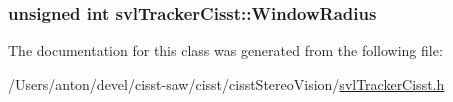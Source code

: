 \subsubsection[{Window\+Radius}]{\setlength{\rightskip}{0pt plus 5cm}unsigned int svl\+Tracker\+Cisst\+::\+Window\+Radius\hspace{0.3cm}{\ttfamily [protected]}}\label{classsvl_tracker_cisst_ab5a2873a52b1514093c0ca59cd4cb51b}


The documentation for this class was generated from the following file\+:\begin{DoxyCompactItemize}
\item 
/\+Users/anton/devel/cisst-\/saw/cisst/cisst\+Stereo\+Vision/\hyperlink{svl_tracker_cisst_8h}{svl\+Tracker\+Cisst.\+h}\end{DoxyCompactItemize}
